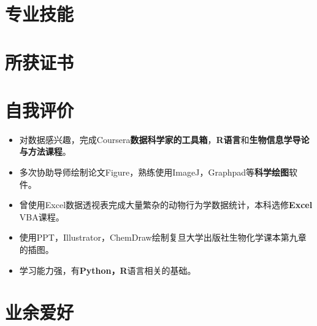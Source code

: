 \documentclass[11pt,a4paper]{moderncv-zh}
\begin{document}
 \section{专业技能}
 \section{所获证书}

 \section{自我评价}
 \begin{itemize}
 	\item 对数据感兴趣，完成Coursera\textbf{数据科学家的工具箱}，\textbf{R语言}和\textbf{生物信息学导论与方法课程}。
 	\item 多次协助导师绘制论文Figure，熟练使用ImageJ，Graphpad等\textbf{科学绘图}软件。
 	\item 曾使用Excel数据透视表完成大量繁杂的动物行为学数据统计，本科选修\textbf{Excel} VBA课程。
 	\item 使用PPT，Illustrator，ChemDraw绘制复旦大学出版社生物化学课本第九章的插图。
 	\item 学习能力强，有\textbf{Python，R}语言相关的基础。
\end{itemize}
 \section{业余爱好}
 
 
\end{document}
